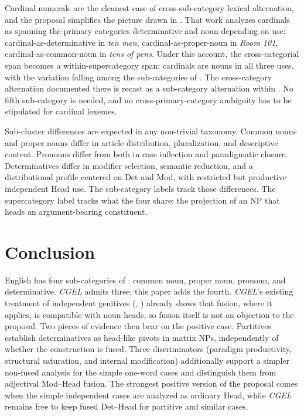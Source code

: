 \documentclass[12pt]{article}
\begin{document}
Cardinal numerals are the cleanest case of cross-sub-category lexical alternation, and the proposal simplifies the picture drawn in \citet{anon2026numerals}. That work analyzes cardinals as spanning the primary categories determinative and noun depending on use: cardinal-as-determinative in \textit{ten men}, cardinal-as-proper-noun in \textit{Room 101}, cardinal-as-common-noun in \textit{tens of pens}. Under this account, the cross-categorial span becomes a within-supercategory span: cardinals are nouns in all three uses, with the variation falling among the sub-categories of . The cross-category alternation documented there is recast as a sub-category alternation within . No fifth sub-category is needed, and no cross-primary-category ambiguity has to be stipulated for cardinal lexemes.

Sub-cluster differences are expected in any non-trivial taxonomy. Common nouns and proper nouns differ in article distribution, pluralization, and descriptive content. Pronouns differ from both in case inflection and paradigmatic closure. Determinatives differ in modifier selection, semantic reduction, and a distributional profile centered on Det and Mod, with restricted but productive independent Head use. The sub-category labels track those differences. The supercategory label tracks what the four share: the projection of an NP that heads an argument-bearing constituent.

\section{Conclusion}\label{sec:conclusion}

English has four sub-categories of : common noun, proper noun, pronoun, and determinative. \textit{CGEL} admits three; this paper adds the fourth. \textit{CGEL}'s existing treatment of independent genitives (, ) already shows that fusion, where it applies, is compatible with noun heads, so fusion itself is not an objection to the proposal. Two pieces of evidence then bear on the positive case. Partitives establish determinatives as head-like pivots in matrix NPs, independently of whether the construction is fused. Three discriminators (paradigm productivity, structural saturation, and internal modification) additionally support a simpler non-fused analysis for the simple one-word cases and distinguish them from adjectival Mod--Head fusion. The strongest positive version of the proposal comes when the simple independent cases are analyzed as ordinary Head, while \textit{CGEL} remains free to keep fused Det--Head for partitive and similar cases.
\end{document}

